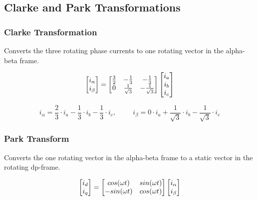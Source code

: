 
\subsection{Clarke and Park Transformations}




\subsubsection{Clarke Transformation}
Converts the three rotating phase currents to one rotating vector in the alpha-beta frame. 

\begin{equation}
    \centering
    \begin{bmatrix}
        i_{\alpha} \\ 
        i_{\beta}
    \end{bmatrix}
    =
    \begin{bmatrix}
        \frac{3}{2} & -\frac{1}{3} & -\frac{1}{3} \\
        0 & \frac{1}{\sqrt{3}} & -\frac{1}{\sqrt{3}} \\
    \end{bmatrix}
    \begin{bmatrix}
        i_{a} \\ 
        i_{b} \\ 
        i_{c}
    \end{bmatrix}
\end{equation}


\begin{equation}
    i_{\alpha} = \frac{2}{3} \cdot i_a - \frac{1}{3} \cdot i_b - \frac{1}{3} \cdot i_c
    , \hspace{1cm}
    i_{\beta} = 0 \cdot i_a + \frac{1}{\sqrt{3}} \cdot i_b - \frac{1}{\sqrt{3}} \cdot i_c
    \label{eq:clarke_transformation}
\end{equation}


\subsubsection{Park Transform}
Converts the one rotating vector in the alpha-beta frame to a static vector in the rotating dp-frame. 

\begin{equation}
    \centering
    \begin{bmatrix}
        i_{d} \\ 
        i_{q}
    \end{bmatrix}
    =
    \begin{bmatrix}
       cos(\omega t) & sin(\omega t) \\
       -sin(\omega t) & cos(\omega t)
    \end{bmatrix}
    \begin{bmatrix}
        i_{\alpha} \\ 
        i_{\beta}
    \end{bmatrix}
\end{equation}

